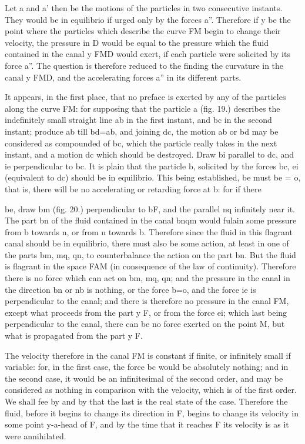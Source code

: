 \documentclass{article}
\begin{document}
Let a and a' then be the motions of the particles in two consecutive instants. They would be in equilibrio if urged only by the forces a''. Therefore if y be the point where the particles which describe the curve FM begin to change their velocity, the pressure in D would be equal to the pressure which the fluid contained in the canal y FMD would exert, if each particle were solicited by its force a''. The question is therefore reduced to the finding the curvature in the canal y FMD, and the accelerating forces a'' in its different parts.

It appears, in the first place, that no preface is exerted by any of the particles along the curve FM: for supposing that the particle a (fig. 19.) describes the indefinitely small straight line ab in the first instant, and bc in the second instant; produce ab till bd=ab, and joining dc, the motion ab or bd may be considered as compounded of bc, which the particle really takes in the next instant, and a motion dc which should be destroyed. Draw bi parallel to dc, and ie perpendicular to bc. It is plain that the particle b, solicited by the forces bc, ei (equivalent to dc) should be in equilibrio. This being established, be must be = o, that is, there will be no accelerating or retarding force at b: for if there

be, draw bm (fig. 20.) perpendicular to bF, and the parallel nq infinitely near it. The part bn of the fluid contained in the canal bnqm would fulain some pressure from b towards n, or from n towards b. Therefore since the fluid in this flagrant canal should be in equilibrio, there must also be some action, at least in one of the parts bm, mq, qn, to counterbalance the action on the part bn. But the fluid is flagrant in the space FAM (in consequence of the law of continuity). Therefore there is no force which can act on bm, mq, qn; and the pressure in the canal in the direction bn or nb is nothing, or the force b=o, and the force ie is perpendicular to the canal; and there is therefore no pressure in the canal FM, except what proceeds from the part y F, or from the force ei; which last being perpendicular to the canal, there can be no force exerted on the point M, but what is propagated from the part y F.

The velocity therefore in the canal FM is constant if finite, or infinitely small if variable: for, in the first case, the force bc would be absolutely nothing; and in the second case, it would be an infinitesimal of the second order, and may be considered as nothing in comparison with the velocity, which is of the first order. We shall fee by and by that the last is the real state of the case. Therefore the fluid, before it begins to change its direction in F, begins to change its velocity in some point y-a-head of F, and by the time that it reaches F its velocity is as it were annihilated.
\end{document}
